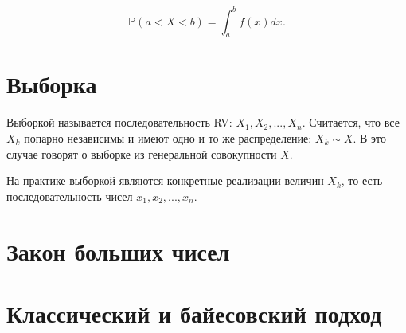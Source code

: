 $$
\mathbb{P}(a<X<b)=\int_{a}^{b}f(x)dx.
$$

\section{Выборка}

Выборкой называется последовательность RV: $X_1, X_2, ..., X_n$. Считается, что все $X_k$ попарно независимы и имеют одно и то же распределение: $X_k \sim X$. В это случае говорят о выборке из генеральной совокупности $X$. 

На практике выборкой являются конкретные реализации величин $X_k$, то есть последовательность чисел $x_1, x_2, ..., x_n$.

\section{Закон больших чисел}

\section{Классический и байесовский подход}
